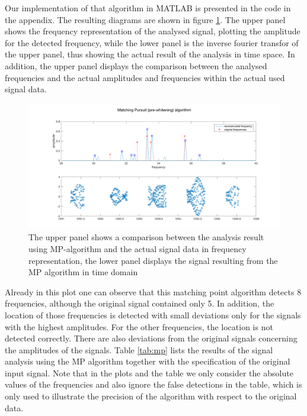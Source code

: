 Our implementation of that algorithm in MATLAB is presented in the code in the appendix. The resulting diagrams are shown in figure \ref{fig:mp}. The upper panel shows the frequency representation of the analysed signal, plotting the amplitude for the detected frequency, while the lower panel is the inverse fourier transfor of the upper panel, thus showing the actual result of the analysis in time space. In addition, the upper panel displays the comparison between the analysed frequencies and the actual amplitudes and frequencies within the actual used signal data.

\begin{figure}[!h]
	\centering
		\includegraphics[width=\textwidth]{images/mp}
		\caption{The upper panel shows a comparison between the analysis result using MP-algorithm and the actual signal data in frequency representation, the lower panel displays the signal resulting from the MP algorithm in time domain}
		\label{fig:mp}
\end{figure}

Already in this plot one can observe that this matching point algorithm detects 8 frequencies, although the original signal contained only 5. In addition, the location of those frequencies is detected with small deviations only for the signals with the highest amplitudes.  For the other frequencies, the location is not detected correctly. There are also deviations from the original signals concerning the amplitudes of the signals. Table \ref{tab:mp} lists the results of the signal analysis using the MP algorithm together with the specification of the original input signal. Note that in the plots and the table we only consider the absolute values of the frequencies and also ignore the false detections in the table, which is only used to illustrate the precision of the algorithm with respect to the original data.

